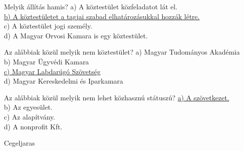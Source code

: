 \begin{frame}

\begin{tcolorbox}[title={91. Kérdés}]
Melyik állítás hamis?
\tcblower
a) A köztestület közfeladatot lát el.\\
\uline {b) A köztestületet a tagjai szabad elhatározásukkal hozzák létre.}\\
c) A köztestület jogi személy.\\
d) A Magyar Orvosi Kamara is egy köztestület.
\end{tcolorbox}

\begin{tcolorbox}[title={92. Kérdés}]
Az alábbiak közül melyik nem köztestület?
\tcblower
a) Magyar Tudományos Akadémia\\
b) Magyar Ügyvédi Kamara\\
\uline {c) Magyar Labdarúgó Szövetség}\\
d) Magyar Kereskedelmi és Iparkamara
\end{tcolorbox}

\begin{tcolorbox}[title={93. Kérdés}]
Az alábbiak közül melyik nem lehet közhasznú státuszú?
\tcblower
\uline {a) A szövetkezet.}\\
b) Az egyesület.\\
c) Az alapítvány.\\
d) A nonprofit Kft.
\end{tcolorbox}

\end{frame}

\begin{frame}[plain]
\begin{tcolorbox}[center, colback={myyellow}, coltext={black}, colframe={myyellow}]
    { Cegeljaras}\\
\end{tcolorbox}
\end{frame}

